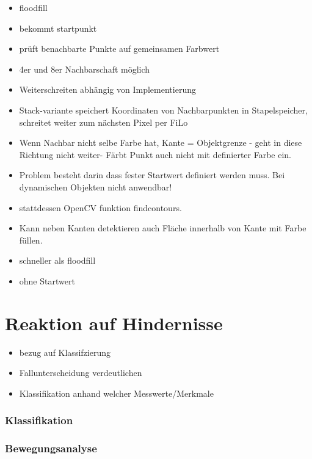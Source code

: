 	\begin{itemize}
	\item floodfill
	\item bekommt startpunkt
	\item prüft benachbarte Punkte auf gemeinsamen Farbwert
	\item 4er und 8er Nachbarschaft möglich
	\item Weiterschreiten abhängig von Implementierung
	\item Stack-variante speichert Koordinaten von Nachbarpunkten in Stapelspeicher, schreitet weiter zum nächsten Pixel per FiLo
	\item Wenn Nachbar nicht selbe Farbe hat, Kante = Objektgrenze - geht in diese Richtung nicht weiter- Färbt Punkt auch nicht mit definierter Farbe ein.
	\item Problem besteht darin dass fester Startwert definiert werden muss. Bei dynamischen Objekten nicht anwendbar!
	\end{itemize}
	\cite{lode-floodfill}
	
	
	\begin{itemize}
	\item stattdessen OpenCV funktion findcontours.
	\item Kann neben Kanten detektieren auch Fläche innerhalb von Kante mit Farbe füllen.
	\item schneller als floodfill
	\item ohne Startwert
	\end{itemize}
	\cite{cv-findcontours}
	\cite{cv-floodfill}
		
\chapter{Reaktion auf Hindernisse}
\begin{itemize}
\item bezug auf Klassifzierung
\item Fallunterscheidung verdeutlichen
\item Klassifikation anhand welcher Messwerte/Merkmale
\end{itemize}
\subsection{Klassifikation}
\subsection{Bewegungsanalyse}
